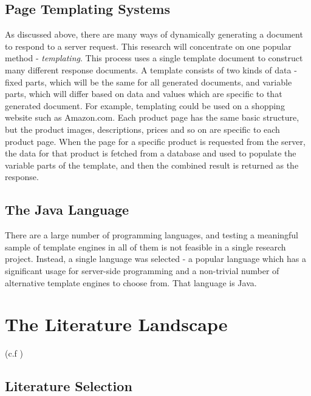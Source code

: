 \subsection{Page Templating Systems}

As discussed above, there are many ways of dynamically generating a document to respond to a server request. This research will concentrate on one popular method - \emph{templating}. This process uses a single template document to construct many different response documents. A template consists of two kinds of data - fixed parts, which will be the same for all generated documents, and variable parts, which will differ based on data and values which are specific to that generated document. For example, templating could be used on a shopping website such as Amazon.com. Each product page has the same basic structure, but the product images, descriptions, prices and so on are specific to each product page. When the page for a specific product is requested from the server, the data for that product is fetched from a database and used to populate the variable parts of the template, and then the combined result is returned as the response.

\subsection{The Java Language}

There are a large number of programming languages, and testing a meaningful sample of template engines in all of them is not feasible in a single research project. Instead, a single language was selected - a popular language which has a significant usage for server-side programming  and a non-trivial number of alternative template engines to choose from. That language is Java.

\section{The Literature Landscape}
\label{section:literature landscape}

 (c.f \citep{Balanza-Martinez2023})


\subsection{Literature Selection}

